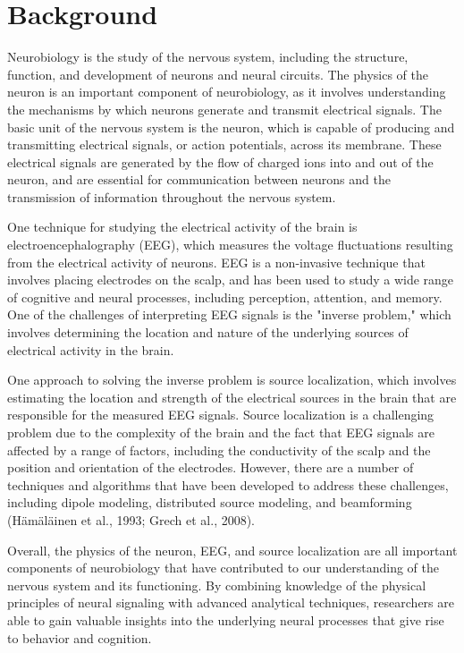 \documentclass[a4paper, UKenglish, 11pt]{uiomaster}
\begin{document}
\chapter{Background}
Neurobiology is the study of the nervous system, including the structure, function, and development of neurons and neural circuits. The physics of the neuron is an important component of neurobiology, as it involves understanding the mechanisms by which neurons generate and transmit electrical signals. The basic unit of the nervous system is the neuron, which is capable of producing and transmitting electrical signals, or action potentials, across its membrane. These electrical signals are generated by the flow of charged ions into and out of the neuron, and are essential for communication between neurons and the transmission of information throughout the nervous system.

One technique for studying the electrical activity of the brain is electroencephalography (EEG), which measures the voltage fluctuations resulting from the electrical activity of neurons. EEG is a non-invasive technique that involves placing electrodes on the scalp, and has been used to study a wide range of cognitive and neural processes, including perception, attention, and memory. One of the challenges of interpreting EEG signals is the "inverse problem," which involves determining the location and nature of the underlying sources of electrical activity in the brain.

One approach to solving the inverse problem is source localization, which involves estimating the location and strength of the electrical sources in the brain that are responsible for the measured EEG signals. Source localization is a challenging problem due to the complexity of the brain and the fact that EEG signals are affected by a range of factors, including the conductivity of the scalp and the position and orientation of the electrodes. However, there are a number of techniques and algorithms that have been developed to address these challenges, including dipole modeling, distributed source modeling, and beamforming (Hämäläinen et al., 1993; Grech et al., 2008).

Overall, the physics of the neuron, EEG, and source localization are all important components of neurobiology that have contributed to our understanding of the nervous system and its functioning. By combining knowledge of the physical principles of neural signaling with advanced analytical techniques, researchers are able to gain valuable insights into the underlying neural processes that give rise to behavior and cognition.
\end{document}
